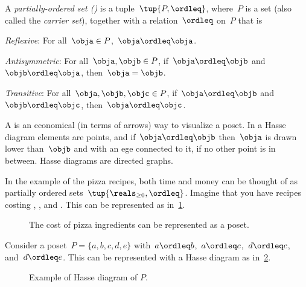 

\begin{definition}
  \label{def:poset}
  A \emph{partially-ordered set ()} is a tuple~$\tup{P,\ordleq}$,
  where~$P$ is a set (also called the \emph{carrier set}), together with a
  relation~$\ordleq$ on~$P$ that is
  \begin{compactenum}
    \item \emph{Reflexive}: For all~$\obja\in P$,~$\obja \ordleq \obja$.
    \item \emph{Antisymmetric}: For all~$\obja,\objb\in P$, if~$\obja\ordleq \objb$ and~$\objb\ordleq \obja$, then~$\obja=\objb$.
    \item \emph{Transitive}: For all~$\obja,\objb,\objc\in P$, if~$\obja\ordleq \objb$ and~$\objb\ordleq \objc$, then~$\obja\ordleq \objc$.
  \end{compactenum}
\end{definition}

A \emph{} is an economical (in terms of arrows) way to visualize a poset. In a Hasse diagram elements are points, and if~$\obja \ordleq \objb$ then~$\obja$ is drawn lower than~$\objb$ and with an ege connected to it, if no other point is in between. Hasse diagrams are directed graphs.

In the example of the pizza recipes, both time and money can be thought of as partially ordered sets~$\tup{\reals_{\geq 0},\ordleq}$. Imagine that you have recipes costing \unit[1]{\USD}, \unit[2]{\USD}, and \unit[3]{\USD}. This can be represented as in~\cref{fig:hassepizza}.

\begin{figure}[h!]
  \begin{center}
    \caption{The cost of pizza ingredients can be represented as a poset.\label{fig:hassepizza}}
  \end{center}
\end{figure}


\begin{example}
  Consider a poset~$P=\{a,b,c,d,e\}$ with~$a\ordleq b$,~$a\ordleq c$,~$d\ordleq c$, and~$d\ordleq e$. This can be represented with a Hasse diagram as in~\cref{fig:hasse}.
\end{example}

\begin{figure}[h!]
  \centering
  \caption{Example of Hasse diagram of $P$. \label{fig:hasse}}
\end{figure}

